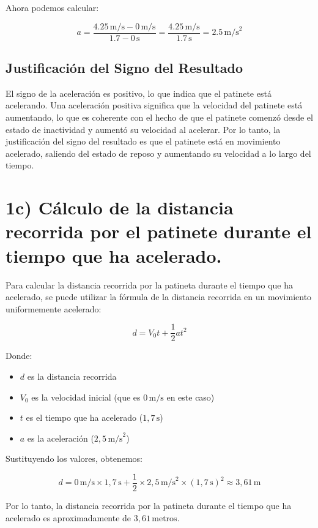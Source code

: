 \documentclass{article}
\begin{document}
Ahora podemos calcular:

\[
a = \frac{4.25 \, \text{m/s} - 0 \, \text{m/s}}{1.7 - 0 \, \text{s}} = \frac{4.25 \, \text{m/s}}{1.7 \, \text{s}} = 2.5 \, \text{m/s}^2
\]

\subsection*{Justificación del Signo del Resultado}

El signo de la aceleración es positivo, lo que indica que el patinete está acelerando. Una aceleración positiva significa que la velocidad del patinete está aumentando, lo que es coherente con el hecho de que el patinete comenzó desde el estado de inactividad y aumentó su velocidad al acelerar. Por lo tanto, la justificación del signo del resultado es que el patinete está en movimiento acelerado, saliendo del estado de reposo y aumentando su velocidad a lo largo del tiempo.

\section*{1c) Cálculo de la distancia recorrida por el patinete durante el tiempo que ha acelerado. } 

Para calcular la distancia recorrida por la patineta durante el tiempo que ha acelerado, se puede utilizar la fórmula de la distancia recorrida en un movimiento uniformemente acelerado:

\[
d = V_0 t + \frac{1}{2} a t^2
\]

Donde:

\begin{itemize}
    \item \(d\) es la distancia recorrida
    \item \(V_0\) es la velocidad inicial (que es \(0 \, \text{m/s}\) en este caso)
    \item \(t\) es el tiempo que ha acelerado (\(1,7 \, \text{s}\))
    \item \(a\) es la aceleración (\(2,5 \, \text{m/s}^2\))
\end{itemize}

Sustituyendo los valores, obtenemos:

\[
d = 0 \, \text{m/s} \times 1,7 \, \text{s} + \frac{1}{2} \times 2,5 \, \text{m/s}^2 \times (1,7 \, \text{s})^2 \approx 3,61 \, \text{m}
\]

Por lo tanto, la distancia recorrida por la patineta durante el tiempo que ha acelerado es aproximadamente de \(3,61 \, \text{metros}\).
\end{document}
